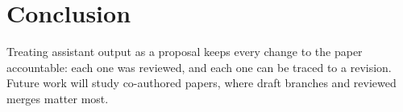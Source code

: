 \section{Conclusion}
\label{sec:conclusion}

Treating assistant output as a proposal keeps every change to the paper accountable: each one was reviewed, and each one can be traced to a revision.
Future work will study co-authored papers, where draft branches and reviewed merges matter most.
